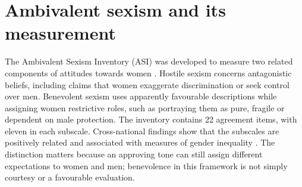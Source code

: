 
\section{Ambivalent sexism and its measurement}\label{sec:bg-asi}

The Ambivalent Sexism Inventory (ASI) was developed to measure two related
components of attitudes towards women \cite{glick1996asi}.
Hostile sexism concerns antagonistic beliefs, including claims that women
exaggerate discrimination or seek control over men. Benevolent sexism uses
apparently favourable descriptions while assigning women restrictive roles,
such as portraying them as pure, fragile or dependent on male protection.
The inventory contains 22 agreement items, with eleven in each subscale.
Cross-national findings show that the subscales are positively related and
associated with measures of gender inequality \cite{glick2000beyond}.
The distinction matters because an approving tone can still assign different
expectations to women and men; benevolence in this framework is not simply
courtesy or a favourable evaluation.

